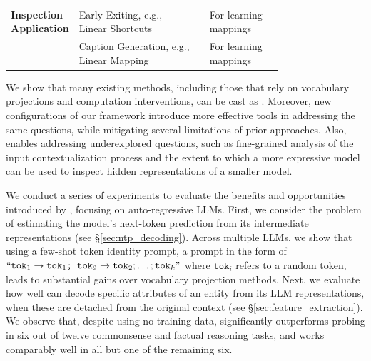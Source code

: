 \documentclass{article}
\theoremstyle{plain}
\theoremstyle{definition}
\theoremstyle{remark}
\begin{document}
\begin{table}[!t]
{\begin{tabular}{m{\lengthone}m{\lengthtwo}m{\lengththree}m{\lengthfour}m{\lengthfive}}
 \multirow{2.5}{*}{{\parbox{\lengthone}{\textbf{Inspection \newline Application}}}} &
  \parbox{\lengthtwo}{Early Exiting, e.g., \newline Linear Shortcuts \cite{din2023jump}} &
  \color[HTML]{34A853}{\faCheck} &
   {For learning \newline mappings} &
  \color[HTML]{34A853}{\faCheck} \\
  
  & 
  \parbox{\lengthtwo}{Caption Generation, e.g., \newline Linear Mapping \cite{merullo2022linearly}} & 
  \color[HTML]{34A853}{\faCheck} &
  {For learning \newline mappings} & 
  \color[HTML]{34A853}{\faCheck} \\ 
 \bottomrule
\end{tabular}
}
\vspace{-1em}
\end{table}

We show that many existing methods, including those that rely on vocabulary projections and computation interventions, can be cast as \methodNamePlural{}. Moreover, new configurations of our framework introduce more effective tools in addressing the same questions, while mitigating several limitations of prior approaches. Also, \methodFamilyName{} enables addressing underexplored questions, such as fine-grained analysis of the input contextualization process and the extent to which a more expressive model can be used to inspect hidden representations of a smaller model.

We conduct a series of experiments to evaluate the benefits and opportunities introduced by \methodFamilyName{}, focusing on auto-regressive LLMs. First, we consider the problem of estimating the model's next-token prediction from its intermediate representations (see \S\ref{sec:ntp_decoding}). Across multiple LLMs, we show that using a few-shot token identity prompt, a prompt in the form of $``\texttt{tok}_1 \rightarrow \texttt{tok}_1 \texttt{; tok}_{2} \rightarrow \texttt{tok}_2 ; \ldots; \texttt{tok}_{k}"$ where $\texttt{tok}_{i}$ refers to a random token, leads to substantial gains over vocabulary projection methods. Next, we evaluate how well \methodFamilyName{} can decode specific attributes of an entity from its LLM representations, when these are detached from the original context (see \S\ref{sec:feature_extraction}). We observe that, despite using no training data, \methodFamilyName{} significantly outperforms probing in six out of twelve commonsense and factual reasoning tasks, and works comparably well in all but one of the remaining six.
\end{document}

